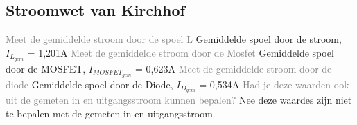 \subsection{Stroomwet van Kirchhof}
\textcolor{gray}{Meet de gemiddelde stroom door de spoel L}\newline
Gemiddelde spoel door de stroom, \(I_{L_{gem}}\) = 1,201A \newline
\newline
\textcolor{gray}{Meet de gemiddelde stroom door de Mosfet}\newline
Gemiddelde spoel door de MOSFET, \(I_{MOSFET_{gem}}\) = 0,623A\newline
\newline
\textcolor{gray}{Meet de gemiddelde stroom door de diode}\newline
Gemiddelde spoel door de Diode, \(I_{D_{gem}}\) = 0,534A\newline
\newline
\textcolor{gray}{Had je deze waarden ook uit de gemeten in en uitgangsstroom kunnen bepalen?}\newline
Nee deze waardes zijn niet te bepalen met de gemeten in en uitgangsstroom.


